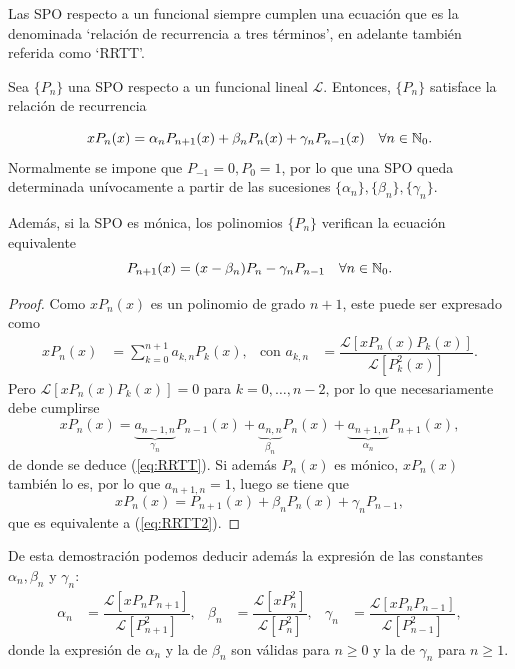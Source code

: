 Las SPO respecto a un funcional siempre cumplen una ecuación que es la denominada `relación de recurrencia a tres términos', en adelante también referida como `RRTT'.

\begin{teorema} 
    \label{th:RRTT}
    Sea $\{P_n\}$ una SPO respecto a un funcional lineal $\mathcal L$. Entonces, $\{P_n\}$ satisface la relación de recurrencia

    \begin{equation}
        \label{eq:RRTT}
        xP_n(x) = \alpha_n P_{n+1}(x) + \beta_n P_n(x) + \gamma_n P_{n-1}(x) \ \ \ \forall n\in\mathbb{N}_0.
    \end{equation}
    Normalmente se impone que $P_{-1}=0, P_0 = 1$, por lo que una SPO queda determinada unívocamente a partir de las sucesiones $\{\alpha_n\},\{\beta_n\},\{\gamma_n\}$.

    Además, si la SPO es mónica, los polinomios $\{P_n\}$ verifican la ecuación equivalente
    \begin{equation}
        \label{eq:RRTT2}
        P_{n+1}(x) = (x-\beta_n) P_n - \gamma_n P_{n-1} \ \ \ \forall n\in\mathbb{N}_0.
    \end{equation}
    
\end{teorema}
\begin{proof}
    Como $xP_n(x)$ es un polinomio de grado $n+1$, este puede ser expresado como 
    \begin{align*}
        xP_n(x) &= \sum_{k=0}^{n+1} a_{k,n} P_k(x), & \text{con } a_{k,n}&= \dfrac{\mathcal{L}[xP_n(x)P_k(x)]}{\mathcal{L}[P_k^2(x)]}. 
    \end{align*}
    Pero $\mathcal{L}[xP_n(x)P_k(x)]=0$ para $k=0,\dots,n-2$, por lo que necesariamente debe cumplirse
    $$
    xP_n(x)  = \underbrace{a_{n-1,n}}_{\gamma_n} P_{n-1}(x) + \underbrace{a_{n,n}}_{\beta_n} P_n(x) + \underbrace{a_{n+1,n}}_{\alpha_n} P_{n+1}(x),
    $$
    de donde se deduce (\ref{eq:RRTT}). Si además $P_n(x)$ es mónico, $xP_n(x)$ también lo es, por lo que $a_{n+1,n}=1$, luego se tiene que 
    $$ xP_n(x)  = P_{n+1}(x) + \beta_n P_n(x) + \gamma_n P_{n-1}, $$ que es equivalente a (\ref{eq:RRTT2}).
\end{proof}

De esta demostración podemos deducir además la expresión de las constantes $\alpha_n, \beta_n$ y $\gamma_n$:
\begin{align}
    \label{eq:ctes-RRTT}
    \alpha_n &= \dfrac{\mathcal{L}[xP_n P_{n+1}]}{\mathcal{L}[P_{n+1}^2]}, & \beta_n &= \dfrac{\mathcal{L}[xP_n^2]}{\mathcal{L}[P_n^2]}, & \gamma_n &= \dfrac{\mathcal{L}[xP_n P_{n-1}]}{\mathcal{L}[P_{n-1}^2]},
\end{align}
donde la expresión de $\alpha_n$ y la de $\beta_n$ son válidas para $n\geq 0$ y la de $\gamma_n$ para $n\geq 1$.

